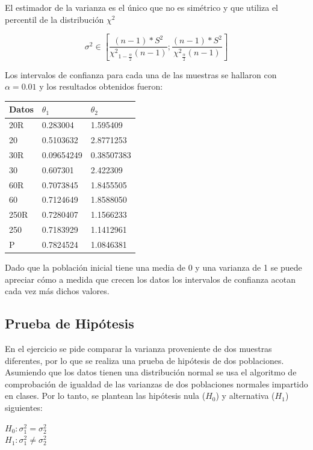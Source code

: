 \documentclass[a4paper,10pt,twocolumn]{report}
\begin{document}
	El estimador de la varianza es el único que no es simétrico y que utiliza el percentil de la distribución ${\chi}^2$
	
	\begin{equation*}
		\sigma^2 \in [\frac{(n-1)*S^2}{{\chi^2}_{1-\frac{\alpha}{2}}(n-1)}; \frac{(n-1)*S^2}{{\chi^2}_{\frac{\alpha}{2}}(n-1)}]
	\end{equation*}
	
	Los intervalos de confianza para cada una de las muestras se hallaron con $\alpha=0.01$ y los resultados obtenidos fueron:
	
	\begin{tabular}[h]{l|ll}
		Datos & $\theta_1$ & $\theta_2$ \\ \hline
		20R   & 0.283004 & 1.595409 \\
		20    & 0.5103632 & 2.8771253  \\
		30R   & 0.09654249 & 0.38507383  \\
		30    & 0.607301 & 2.422309  \\
		60R   & 0.7073845 & 1.8455505  \\
		60    & 0.7124649 & 1.8588050  \\
		250R  & 0.7280407 & 1.1566233  \\
		250   & 0.7183929 & 1.1412961  \\
		P     & 0.7824524 & 1.0846381
	\end{tabular}

	Dado que la población inicial tiene una media de 0 y una varianza de 1 se puede apreciar cómo a medida que crecen los datos los intervalos de confianza acotan cada vez más dichos valores.
	\subsection{Prueba de Hipótesis}\label{sub:ex3}
		
		En el ejercicio se pide comparar la varianza proveniente de dos muestras diferentes, por lo que se realiza una prueba de hipótesis de dos poblaciones. Asumiendo que los datos tienen una distribución normal se usa el algoritmo de comprobación de igualdad de las varianzas de dos poblaciones normales impartido en clases. Por lo tanto, se plantean las hipótesis nula ($H_0$) y alternativa ($H_1$) siguientes: 

		\begin{table}[h]
			\centering
			$H_0: \sigma_1^2 = \sigma_2^2$ \\ 
			$H_1: \sigma_1^2 \neq \sigma_2^2$
		\end{table}
\end{document}
